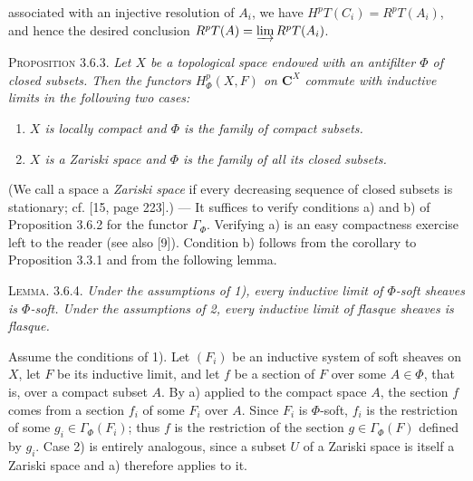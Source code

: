 
\noindent associated with an injective resolution of $A_i$, we have
$H^pT(C_i)=R^pT(A_i)$, and hence the desired conclusion
$R^pT(A)=\varinjlim R^pT(A_i)$.

\indent\textsc{Proposition 3.6.3.} \textit{Let $X$ be a topological
space endowed with an antifilter $\Phi$ of closed subsets. Then the functors
$H^p_\Phi(X,F)$ on $\mathbf C^X$ commute with inductive limits in the following two
cases:}
\begin{enumerate}
\item \textit{$X$ is locally compact and $\Phi$ is the family of compact
subsets.}
\item \textit{$X$ is a Zariski space and $\Phi$ is the family of all its
closed subsets.}
\end{enumerate}

(We call a space a \textit{Zariski space} if every decreasing sequence of
closed subsets is stationary; cf. [15, page 223].) ---
It suffices to verify conditions a) and b) of Proposition 3.6.2 for the functor
$\Gamma_\Phi$. Verifying a) is an easy compactness exercise left to the reader
(see also [9]). Condition b) follows from the corollary to Proposition 3.3.1
and from the following lemma.

\indent\textsc{Lemma. 3.6.4.} \textit{Under the assumptions of \textup{1)}, every
inductive limit of $\Phi$-soft sheaves is $\Phi$-soft. Under the assumptions of
\textup{2}, every inductive limit of flasque sheaves is flasque.}

Assume the conditions of 1). Let $(F_i)$ be an inductive system of
soft sheaves on $X$, let $F$ be its inductive limit, and let $f$ be a
section of $F$ over some $A\in\Phi$, that is, over a compact subset $A$. By a)
applied to the compact space $A$, the section $f$ comes from a section $f_i$ of
some $F_i$ over $A$. Since $F_i$ is $\Phi$-soft, $f_i$ is the restriction of
some $g_i\in\Gamma_\Phi(F_i)$; thus $f$ is the restriction of the section
$g\in\Gamma_\Phi(F)$ defined by $g_i$. Case 2) is entirely analogous, since a
subset $U$ of a Zariski space is itself a Zariski space and a) therefore
applies to it.


